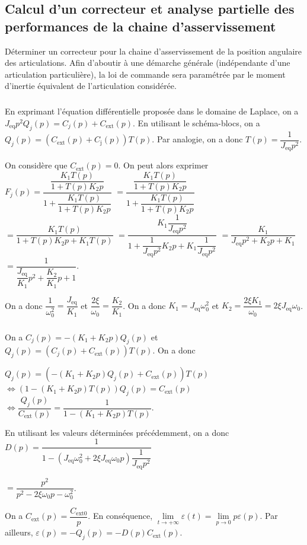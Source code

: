 \documentclass[10pt,fleqn]{article} %
\begin{document}
\subsection{Calcul d’un correcteur et analyse partielle des performances de la chaine d’asservissement}
\begin{obj}
Déterminer un correcteur pour la chaine d’asservissement de la position angulaire des articulations.
Afin d’aboutir à une démarche générale (indépendante d’une articulation particulière), la loi de commande
sera paramétrée par le moment d’inertie équivalent de l’articulation considérée.
\end{obj}

\subparagraph{}%
En exprimant l'équation différentielle proposée dans le domaine de Laplace, on a 
$J_{\text{eq}} p^2{Q}_j(p)=C_j(p)+C_{\text{ext}}(p)$.
En utilisant le schéma-blocs, on a $Q_j(p)=\left(C_{\text{ext}}(p)+C_{\text{j}}(p)\right)T(p)$. 
Par analogie, on a donc $T(p)=\dfrac{1}{J_{\text{eq}}p^2}$.

On considère que $C_{\text{ext}}(p)=0$.  On peut alors exprimer 
$F_j(p)= \dfrac{\dfrac{K_1T(p)}{1+T(p)K_2 p} }{1+\dfrac{K_1T(p)}{1+T(p)K_2 p}}$
$= \dfrac{\dfrac{K_1T(p)}{1+T(p)K_2 p} }{1+\dfrac{K_1T(p)}{1+T(p)K_2 p}}$
$= \dfrac{K_1T(p) }{1+T(p)K_2 p+K_1T(p)}$
$= \dfrac{K_1\dfrac{1}{J_{\text{eq}}p^2}}{1+\dfrac{1}{J_{\text{eq}}p^2}K_2 p+K_1\dfrac{1}{J_{\text{eq}}p^2}}$
$= \dfrac{K_1}{J_{\text{eq}}p^2+K_2 p+K_1}$
$= \dfrac{1}{\dfrac{J_{\text{eq}}}{K_1}p^2+\dfrac{K_2}{K_1}p+1}$.

On a donc $\dfrac{1}{\omega_0^2}=\dfrac{J_{\text{eq}}}{K_1}$ et $\dfrac{2\xi}{\omega_0}=\dfrac{K_2}{K_1}$. On a donc $K_1=J_{\text{eq}}\omega_0^2$ et $K_2=\dfrac{2\xi K_1}{\omega_0}=2\xi J_{\text{eq}}\omega_0$.

\subparagraph{}%
On a $C_j(p)=-\left(K_1+K_2 p\right) Q_j(p)$ et $Q_j(p)=\left(C_j(p)+C_{\text{ext}}(p)\right)T(p)$.  On a donc  

$Q_j(p)=\left(-\left(K_1+K_2 p\right) Q_j(p)+C_{\text{ext}}(p)\right)T(p)$
$\Leftrightarrow \left(1-\left(K_1+K_2 p\right)T(p) \right)Q_j(p)=C_{\text{ext}}(p)$
$\Leftrightarrow \dfrac{Q_j(p)}{C_{\text{ext}}(p)}=\dfrac{1}{1-\left(K_1+K_2 p\right)T(p) }$.

En utilisant les valeurs déterminées précédemment, on a donc $D(p)=\dfrac{1}{1-\left(J_{\text{eq}}\omega_0^2+2\xi J_{\text{eq}}\omega_0 p\right)\dfrac{1}{J_{\text{eq}}p^2} }$

$=\dfrac{p^2}{p^2-2\xi\omega_0 p-\omega_0^2 }$.

On a $C_{\text{ext}}(p)=\dfrac{C_{\text{ext} 0}}{p}$. En conséquence, 
$\lim\limits_{t\to +\infty} \varepsilon(t) = \lim\limits_{p\to 0} p\varepsilon(p)$.
Par ailleurs,  $\varepsilon(p)=-Q_j(p)=-D(p)C_{\text{ext}}(p)$.
\end{document}
